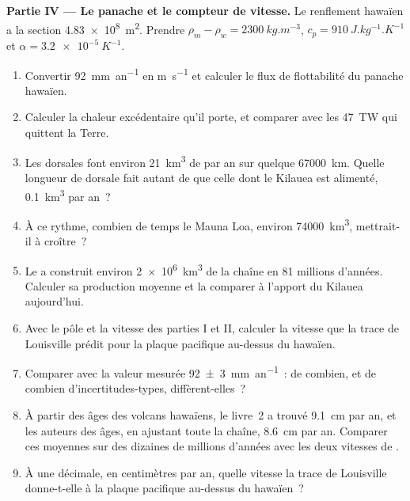 \begin{problem}
\medskip
\noindent\textbf{Partie IV --- Le panache et le compteur de vitesse.} Le renflement hawaïen
a la section \qty{4.83e8}{m^2}. Prendre
$\rho_m - \rho_w = \qty{2300}{kg.m^{-3}}$, $c_p = \qty{910}{J.kg^{-1}.K^{-1}}$
et $\alpha = \qty{3.2e-5}{K^{-1}}$.
\begin{enumerate}[resume]
  \item Convertir \qty{92}{mm.an^{-1}} en \unit{m.s^{-1}} et calculer le
        flux de flottabilité du panache hawaïen.
  \item Calculer la chaleur excédentaire qu'il porte, et comparer avec les \qty{47}{TW}
        qui quittent la Terre.
  \item Les dorsales font environ \qty{21}{km^3} de  par an sur quelque
        \qty{67000}{km}. Quelle longueur de dorsale fait autant de  que celle dont
        le Kilauea est alimenté, \qty{0.1}{km^3} par an~?
  \item À ce rythme, combien de temps le Mauna Loa, environ \qty{74000}{km^3},
        mettrait-il à croître~?
  \item Le  a construit environ \qty{2e6}{km^3} de la chaîne en 81 millions
        d'années. Calculer sa production moyenne et la comparer à l'apport du Kilauea aujourd'hui.
  \item Avec le pôle et la vitesse des parties I et II, calculer la vitesse que
        la trace de Louisville prédit pour la plaque pacifique au-dessus du 
        hawaïen.
  \item Comparer avec la valeur mesurée \qty[uncertainty-mode=separate]{92 \pm 3}{mm.an^{-1}}~: de combien, et
        de combien d'incertitudes-types, diffèrent-elles~?
  \item À partir des âges des volcans hawaïens, le livre~2 a trouvé \qty{9.1}{cm} par
        an, et les auteurs des âges, en ajustant toute la chaîne,
        \qty{8.6}{cm} par an. Comparer ces moyennes sur des dizaines de millions
        d'années avec les deux vitesses de .
  \item À une décimale, en centimètres par an, quelle vitesse la trace de Louisville
        donne-t-elle à la plaque pacifique au-dessus du  hawaïen~?
\end{enumerate}
\end{problem}
